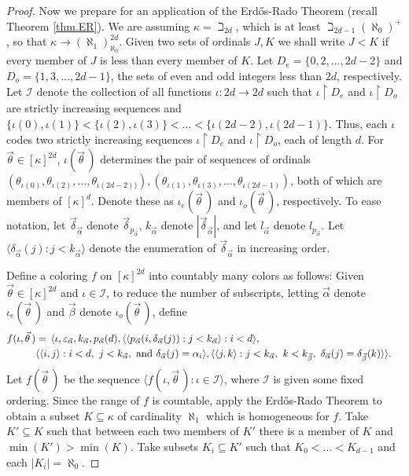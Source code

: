 \documentclass{amsart}
\theoremstyle{remark}
\theoremstyle{definition}
\theoremstyle{remark}
\newcommand{\al}{\alpha}
\newcommand{\sse}{\subseteq}
\newcommand{\re}{\restriction}
\newcommand{\ra}{\rightarrow}
\newcommand{\lgl}{\langle}
\newcommand{\rgl}{\rangle}
\newcommand{\Erdos}{Erd{\H{o}}s}
\begin{document}
\begin{proof}
Now we prepare  for an application of the \Erdos-Rado Theorem (recall Theorem \ref{thm.ER}).
We are assuming $\kappa=\beth_{2d}$, which is at least  $\beth_{2d-1}(\aleph_0)^+$,  so  that  $\kappa\ra(\aleph_1)^{2d}_{\aleph_0}$.
Given two sets of ordinals $J,K$ we shall write $J<K$ if every member of $J$ is less than every member of $K$.
Let $D_e=\{0,2,\dots,2d-2\}$ and  $D_o=\{1,3,\dots,2d-1\}$, the sets of  even and odd integers less than $2d$, respectively.
Let $\mathcal{I}$ denote the collection of all functions $\iota: 2d\ra 2d$ such that
$\iota\re D_e$
and $\iota\re D_o$ are strictly  increasing sequences
and $\{\iota(0),\iota(1)\}<\{\iota(2),\iota(3)\}<\dots<\{\iota(2d-2),\iota(2d-1)\}$.
Thus, each $\iota$ codes two strictly increasing sequences $\iota\re D_e$ and $\iota\re D_o$, each of length $d$.
For $\vec{\theta}\in[\kappa]^{2d}$,
$\iota(\vec{\theta}\,)$ determines the pair of sequences of ordinals $(\theta_{\iota(0)},\theta_{\iota(2)},\dots,\theta_{\iota(2d-2))}), (\theta_{\iota(1)},\theta_{\iota(3)},\dots,\theta_{\iota(2d-1)})$,
both of which are members of $[\kappa]^d$.
Denote these as $\iota_e(\vec\theta\,)$ and $\iota_o(\vec\theta\,)$, respectively.
To ease notation, let $\vec{\delta}_{\vec\al}$ denote $\vec\delta_{p_{\vec\al}}$,
 $k_{\vec{\al}}$ denote $|\vec{\delta}_{\vec\al}|$,
and let $l_{\vec{\al}}$ denote  $l_{p_{\vec\al}}$.
Let $\lgl \delta_{\vec{\al}}(j):j<k_{\vec{\al}}\rgl$
denote the enumeration of $\vec{\delta}_{\vec\al}$
in increasing order.


Define a coloring  $f$ on $[\kappa]^{2d}$ into countably many colors as follows:
Given  $\vec\theta\in[\kappa]^{2d}$ and
 $\iota\in\mathcal{I}$, to reduce the number of subscripts,  letting
$\vec\al$ denote $\iota_e(\vec\theta\,)$ and $\vec\beta$ denote $\iota_o(\vec\theta\,)$,
define
\begin{align}\label{eq.fiotatheta}
f(\iota,\vec\theta\,)&= \,
\lgl \iota, \varepsilon_{\vec{\al}}, k_{\vec{\al}}, p_{\vec{\al}}(d),
\lgl \lgl p_{\vec{\al}}(i,\delta_{\vec{\al}}(j)):j<k_{\vec{\al}}\rgl:i< d\rgl,\cr
& \lgl  \lgl i,j \rgl: i< d,\ j<k_{\vec{\al}},\ \mathrm{and\ } \delta_{\vec{\al}}(j)=\al_i \rgl,
\lgl \lgl j,k\rgl:j<k_{\vec{\al}},\ k<k_{\vec{\beta}},\ \delta_{\vec{\al}}(j)=\delta_{\vec{\beta}}(k)\rgl\rgl.
\end{align}
Let $f(\vec{\theta}\,)$ be the sequence $\lgl f(\iota,\vec\theta\,):\iota\in\mathcal{I}\rgl$, where $\mathcal{I}$ is given some fixed ordering.
Since the range of $f$ is countable,
apply the \Erdos-Rado Theorem
to  obtain a subset $K\sse\kappa$ of cardinality $\aleph_1$
which is homogeneous for $f$.
Take $K'\sse K$ such that between each two members of $K'$ there is a member of $K$ and $\min(K')>\min(K)$.
Take subsets $K_i\sse K'$ such that  $K_0<\dots<K_{d-1}$
and   each $|K_i|=\aleph_0$.




\end{proof}
\end{document}
